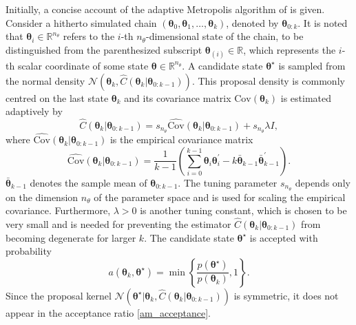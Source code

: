 \documentclass[twoside,11pt]{article}
\begin{document}
Initially, a concise account of the adaptive Metropolis algorithm of \cite{haa_sak_tam__ana} is given. Consider a hitherto
simulated chain $(\boldsymbol{\theta}_{0}, \boldsymbol{\theta}_{1},\dots,\boldsymbol{\theta}_{k})$, denoted by 
$\boldsymbol{\theta}_{0:k}$. It is noted that $\boldsymbol{\theta}_{i}\in\mathbb{R}^{n_{\theta}}$ refers to the $i$-th 
$n_{\theta}$-dimensional state of the chain, to 
be distinguished from the parenthesized subscript $\boldsymbol{\theta}_{(i)}\in\mathbb{R}$, which represents the $i$-th 
scalar coordinate of some state $\boldsymbol{\theta}\in\mathbb{R}^{n_{\theta}}$. A candidate state 
$\boldsymbol{\theta}^{\star}$ is sampled from the normal density
$\mathcal{N}(\boldsymbol{\theta}_{k}, \hat{C}(\boldsymbol{\theta}_{k}|\boldsymbol{\theta}_{0:k-1}))$. This proposal density 
is commonly centred on the last state $\boldsymbol{\theta}_{k}$ and its covariance matrix 
$\mbox{Cov}(\boldsymbol{\theta}_{k})$ is estimated adaptively by
\begin{equation}
\label{am_c}
\hat{C}(\boldsymbol{\theta}_{k}|\boldsymbol{\theta}_{0:k-1})=
s_{n_{\theta}}\widehat{\mbox{Cov}}(\boldsymbol{\theta}_{k}|\boldsymbol{\theta}_{0:k-1})+
s_{n_{\theta}}\lambda I,
\end{equation}
where $\widehat{\mbox{Cov}}(\boldsymbol{\theta}_{k}|\boldsymbol{\theta}_{0:k-1})$ is the empirical covariance 
matrix
\begin{equation}
\label{am_cov}
\widehat{\mbox{Cov}}(\boldsymbol{\theta}_{k}|\boldsymbol{\theta}_{0:k-1})=
\frac{1}{k-1}\left(
\sum_{i=0}^{k-1}\boldsymbol{\theta}_{i}\boldsymbol{\theta}_{i}^{'}-
k\bar{\boldsymbol{\theta}}_{k-1}\bar{\boldsymbol{\theta}}_{k-1}^{'}
\right).
\end{equation}
$\bar{\boldsymbol{\theta}}_{k-1}$ denotes the sample mean of $\boldsymbol{\theta}_{0:k-1}$. The tuning parameter 
$s_{n_{\theta}}$ depends only on the dimension $n_{\theta}$ of the parameter space and is used for scaling the empirical 
covariance. Furthermore, $\lambda>0$ is another tuning constant, which is chosen to be very small and is needed for 
preventing the estimator $\hat{C}(\boldsymbol{\theta}_{k}|\boldsymbol{\theta}_{0:k-1})$ from becoming degenerate for larger 
$k$. The candidate state $\boldsymbol{\theta}^{\star}$ is accepted with probability
\begin{equation}
\label{am_acceptance}
a(\boldsymbol{\theta}_{k},\boldsymbol{\theta}^{\star}) =
\min\left\{
\frac{p(\boldsymbol{\theta}^{\star})}{p(\boldsymbol{\theta}_{k})}
, 1
\right\}.
\end{equation}
Since the proposal kernel
$
\mathcal{N}(\boldsymbol{\theta}^{\star}|\boldsymbol{\theta}_{k}, 
\hat{C}(\boldsymbol{\theta}_{k}|\boldsymbol{\theta}_{0:k-1}))
$
is symmetric, it does not appear in the acceptance ratio \eqref{am_acceptance}.
\end{document}
